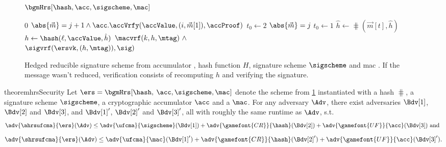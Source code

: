\begin{figure}[!t]
\begin{algobox}{$\bgmHrs[\hash, \acc, \sigscheme, \mac]$}
{\begin{minipage}[t]{.53\linewidth}
\begin{algorithmic}
         \Return $0$ \EndIf
          \State \KwReq{} \mbox{$\abs{\vec m} = j+1 \land \acc.\accVrfy(\accValue, (i, \vec m[1]), \accProof)$}
          \State $t_0 \gets 2$
        \Else
          \State \KwReq{} {$\abs{\vec m} = j$}
          \State $t_0 \gets 1$
        \EndIf
           $\hat{h} \gets \hash(\vec m[t], \hat{h})$
        \EndFor
        \State $h \gets \hash(\ell, \accValue, \hat{h})$
        \State \Return $\macvrf(k, h, \mtag) \ \wedge $ \\\hspace*{2em} $\sigvrf(\ersvk, (h, \mtag)), \sig)$
      \end{algorithmic}
    \end{minipage}
  }
\end{algobox}
\caption{Hedged reducible signature scheme \ers from accumulator \acc, hash function $H$, signature
    scheme $\sigscheme$ and mac \mac. If the message wasn't reduced, verification consists of recomputing $h$ and
    verifying the signature.}
  \label{fig:red_sig}
\end{figure}

\begin{restatable}{theorem}{hrsSecurity}\label{thm:acc_sec}
  Let $\ers = \bgmHrs[\hash,$ $ \acc, \sigscheme, \mac]$ denote the scheme from \cref{fig:red_sig} instantiated with a hash $\hash$, a signature scheme $\sigscheme$, a cryptographic accumulator $\acc$ and a $\mac$.
  For any adversary $\Adv$, there exist adversaries $\Bdv[1]$, $\Bdv[2]$ and $\Bdv[3]$, and $\Bdv[1]'$, $\Bdv[2]'$ and $\Bdv[3]'$, all with roughly the same runtime as $\Adv$, s.t.
  \begin{equation*}\label{eq:hrs-sec1}
    \adv{\ahrsufcma}{\ers}({\Adv}) \leq \adv{\text{\ufcma}}{\sigscheme}({\Bdv[1]}) +
    \adv{\gamefont{CR}}{\hash}({\Bdv[2]}) +
    \adv{\gamefont{UF}}{\acc}({\Bdv[3]}) \text{ and }
  \end{equation*}
  \begin{equation*}\label{eq:hrs-sec2}
    \adv{\shrsufcma}{\ers}({\Adv}) \leq \adv{\ufcma}{\mac}({\Bdv[1]'}) +
    \adv{\gamefont{CR}}{\hash}({\Bdv[2]'}) +
    \adv{\gamefont{UF}}{\acc}({\Bdv[3]'}).
  \end{equation*}
\end{restatable}

